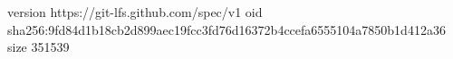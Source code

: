 version https://git-lfs.github.com/spec/v1
oid sha256:9fd84d1b18cb2d899aec19fcc3fd76d16372b4ccefa6555104a7850b1d412a36
size 351539
